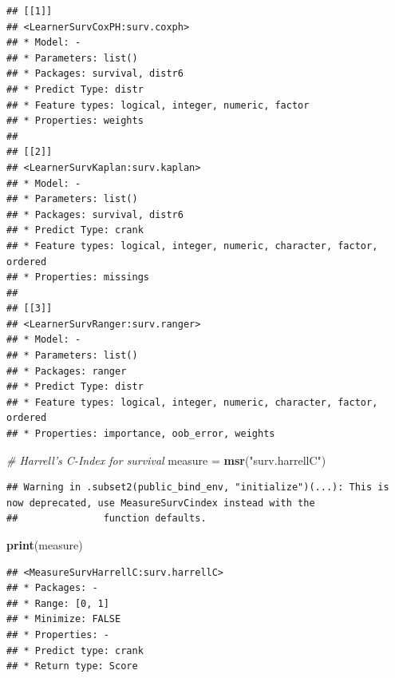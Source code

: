 \documentclass[]{scrbook}
\newenvironment{Shaded}{\begin{snugshade}}{\end{snugshade}}
\newcommand{\CommentTok}[1]{\textcolor[rgb]{0.56,0.35,0.01}{\textit{#1}}}
\newcommand{\DataTypeTok}[1]{\textcolor[rgb]{0.13,0.29,0.53}{#1}}
\newcommand{\DecValTok}[1]{\textcolor[rgb]{0.00,0.00,0.81}{#1}}
\newcommand{\KeywordTok}[1]{\textcolor[rgb]{0.13,0.29,0.53}{\textbf{#1}}}
\newcommand{\NormalTok}[1]{#1}
\newcommand{\OperatorTok}[1]{\textcolor[rgb]{0.81,0.36,0.00}{\textbf{#1}}}
\newcommand{\StringTok}[1]{\textcolor[rgb]{0.31,0.60,0.02}{#1}}
\renewenvironment{Shaded} {\begin{snugshade}\small} {\end{snugshade}}
\begin{document}
\begin{verbatim}
## [[1]]
## <LearnerSurvCoxPH:surv.coxph>
## * Model: -
## * Parameters: list()
## * Packages: survival, distr6
## * Predict Type: distr
## * Feature types: logical, integer, numeric, factor
## * Properties: weights
## 
## [[2]]
## <LearnerSurvKaplan:surv.kaplan>
## * Model: -
## * Parameters: list()
## * Packages: survival, distr6
## * Predict Type: crank
## * Feature types: logical, integer, numeric, character, factor, ordered
## * Properties: missings
## 
## [[3]]
## <LearnerSurvRanger:surv.ranger>
## * Model: -
## * Parameters: list()
## * Packages: ranger
## * Predict Type: distr
## * Feature types: logical, integer, numeric, character, factor, ordered
## * Properties: importance, oob_error, weights
\end{verbatim}

\begin{Shaded}
\begin{Highlighting}[]
\CommentTok{# Harrell's C-Index for survival}
\NormalTok{measure =}\StringTok{ }\KeywordTok{msr}\NormalTok{(}\StringTok{"surv.harrellC"}\NormalTok{)}
\end{Highlighting}
\end{Shaded}

\begin{verbatim}
## Warning in .subset2(public_bind_env, "initialize")(...): This is now deprecated, use MeasureSurvCindex instead with the
##               function defaults.
\end{verbatim}

\begin{Shaded}
\begin{Highlighting}[]
\KeywordTok{print}\NormalTok{(measure)}
\end{Highlighting}
\end{Shaded}

\begin{verbatim}
## <MeasureSurvHarrellC:surv.harrellC>
## * Packages: -
## * Range: [0, 1]
## * Minimize: FALSE
## * Properties: -
## * Predict type: crank
## * Return type: Score
\end{verbatim}

\begin{Shaded}
\end{Shaded}
\end{document}

